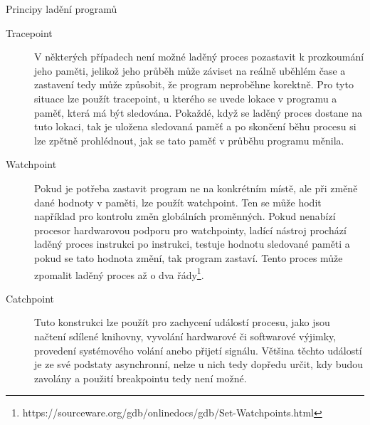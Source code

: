 \documentclass[bc,male,python,dept460]{diploma}						%
\begin{document}
\begin{section}{Principy ladění programů}
\begin{description}
			\item[Tracepoint]
				V některých případech není možné laděný proces pozastavit k prozkoumání jeho paměti, jelikož jeho průběh může záviset na reálně uběhlém čase a zastavení
				tedy může způsobit, že program neproběhne korektně. Pro tyto situace lze použít tracepoint, u kterého se uvede lokace v programu a paměť, která má být
				sledována. Pokaždé, když se laděný proces dostane na tuto lokaci, tak je uložena sledovaná paměť a po skončení běhu procesu si lze zpětně prohlédnout,
				jak se tato paměť v průběhu programu měnila.
			\item[Watchpoint]
				Pokud je potřeba zastavit program ne na konkrétním místě, ale při změně dané hodnoty v paměti, lze použít watchpoint. Ten se může hodit například pro
				kontrolu změn globálních proměnných. Pokud nenabízí procesor hardwarovou podporu pro watchpointy, ladící nástroj prochází laděný proces instrukci po
				instrukci, testuje hodnotu sledované paměti a pokud se tato hodnota změní, tak program zastaví. Tento proces může zpomalit laděný proces až o
				dva řády\footnote{https://sourceware.org/gdb/onlinedocs/gdb/Set-Watchpoints.html}.
			\item[Catchpoint]
				Tuto konstrukci lze použít pro zachycení událostí procesu, jako jsou načtení sdílené knihovny, vyvolání hardwarové či softwarové výjimky, provedení
				systémového volání anebo přijetí signálu. Většina těchto událostí je ze své podstaty asynchronní, nelze u nich tedy dopředu určit, kdy budou zavolány
				a použití breakpointu tedy není možné.
		\end{description}		
\end{section}
\end{document}

